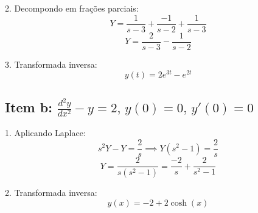 \documentclass[12pt,a4paper]{article}
\begin{document}
2. Decompondo em frações parciais:
\[
Y = \frac{1}{s - 3} + \frac{-1}{s - 2} + \frac{1}{s - 3}
\]
\[
Y = \frac{2}{s - 3} - \frac{1}{s - 2}
\]

3. Transformada inversa:
\[
y(t) = 2e^{3t} - e^{2t}
\]

\subsection*{Item b: \(\frac{d^2y}{dx^2} - y = 2, \, y(0) = 0, \, y'(0) = 0\)}

1. Aplicando Laplace:
\[
s^2Y - Y = \frac{2}{s} \implies Y(s^2 - 1) = \frac{2}{s}
\]
\[
Y = \frac{2}{s(s^2 - 1)} = \frac{-2}{s} + \frac{2}{s^2 - 1}
\]

2. Transformada inversa:
\[
y(x) = -2 + 2\cosh(x)
\]
\end{document}
